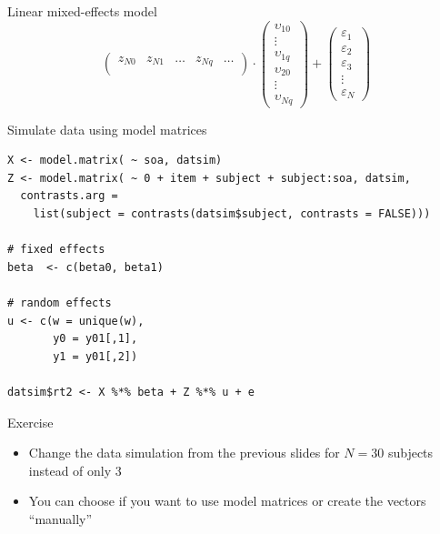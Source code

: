 \documentclass[aspectratio=169]{beamer}
\begin{document}
\begin{frame}[shrink=10]{Linear mixed-effects model}
\begin{equation*}
\begin{pmatrix}
    z_{N0} & z_{N1} & \dots & z_{Nq} & \dots \\
  \end{pmatrix} \cdot
  \begin{pmatrix}
    \upsilon_{10} \\
    \vdots \\
    \upsilon_{1q}\\
    \upsilon_{20} \\
    \vdots \\
    \upsilon_{Nq}
  \end{pmatrix} + 
  \begin{pmatrix}
    \varepsilon_1 \\
    \varepsilon_2 \\
    \varepsilon_3 \\
    \vdots \\
    \varepsilon_N
  \end{pmatrix}
\end{equation*}
\end{frame}


\begin{frame}[fragile]{Simulate data using model matrices}
  \begin{lstlisting}
X <- model.matrix( ~ soa, datsim)
Z <- model.matrix( ~ 0 + item + subject + subject:soa, datsim,
  contrasts.arg = 
    list(subject = contrasts(datsim$subject, contrasts = FALSE)))

# fixed effects
beta  <- c(beta0, beta1)

# random effects
u <- c(w = unique(w),
       y0 = y01[,1],
       y1 = y01[,2])

datsim$rt2 <- X %*% beta + Z %*% u + e
  \end{lstlisting}
\end{frame}

\begin{frame}[fragile]{}
  \begin{block}{Exercise}
    \begin{itemize}
      \item Change the data simulation from the previous slides for $N =
        30$ subjects instead of only 3
      \item You can choose if you want to use model matrices or create
        the vectors ``manually''
    \end{itemize}
  \end{block}
  \nocite{Wickelmaier2022}
\end{frame}
\end{document}
